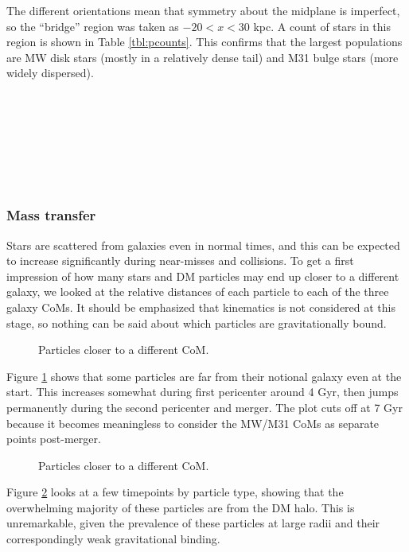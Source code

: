 \documentclass[twocolumn]{aastex63}
\newcommand{\todo}{\color{red}{TODO}\color{black}\hspace{2mm}}
\begin{document}
The different orientations mean that symmetry about the midplane is imperfect, so the ``bridge'' region was taken as $-20 < x < 30$ kpc. A count of stars in this region is shown in Table \ref{tbl:pcounts}. This confirms that the largest populations are MW disk stars (mostly in a relatively dense tail) and M31 bulge stars (more widely dispersed).

\todo{identify, trace history, trace fate}\ 

\todo{Jacobi radius}\ 

\todo{Tail kinematics: $\sigma$, energy}\ 

\todo{Lifetime of tails}\ 



\subsubsection{Mass transfer}

Stars are scattered from galaxies even in normal times, and this can be expected to increase significantly during near-misses and collisions. To get a first impression of how many stars and DM particles may end up closer to a different galaxy, we looked at the relative distances of each particle to each of the three galaxy CoMs. It should be emphasized that kinematics is not considered at this stage, so nothing can be said about which particles are gravitationally bound.

\begin{figure}[htb!]
	\caption{Particles closer to a different CoM.
		\label{fig:trans_count}}
\end{figure}

Figure \ref{fig:trans_count} shows that some particles are far from their notional galaxy even at the start. This increases somewhat during first pericenter around 4 Gyr, then jumps permanently during the second pericenter and merger. The plot cuts off at 7 Gyr because it becomes meaningless to consider the MW/M31 CoMs as separate points post-merger.

\begin{figure}[htb!]
	\caption{Particles closer to a different CoM.
		\label{fig:trans_p}}
\end{figure}

Figure \ref{fig:trans_p} looks at a few timepoints by particle type, showing that the overwhelming majority of these particles are from the DM halo. This is unremarkable, given the prevalence of these particles at large radii and their correspondingly weak gravitational binding.
\end{document}
